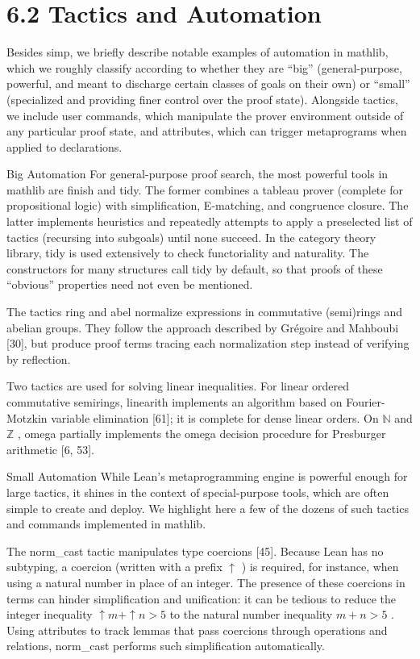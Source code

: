 \documentclass[
]{article}
\newcounter{none} %
\begin{document}
\section{6.2 Tactics and Automation}\label{tactics-and-automation}

Besides simp, we briefly describe notable examples of automation in
mathlib, which we roughly classify according to whether they are ``big''
(general-purpose, powerful, and meant to discharge certain classes of
goals on their own) or ``small'' (specialized and providing finer
control over the proof state). Alongside tactics, we include user
commands, which manipulate the prover environment outside of any
particular proof state, and attributes, which can trigger metaprograms
when applied to declarations.

Big Automation For general-purpose proof search, the most powerful tools
in mathlib are finish and tidy. The former combines a tableau prover
(complete for propositional logic) with simplification, E-matching, and
congruence closure. The latter implements heuristics and repeatedly
attempts to apply a preselected list of tactics (recursing into
subgoals) until none succeed. In the category theory library, tidy is
used extensively to check functoriality and naturality. The constructors
for many structures call tidy by default, so that proofs of these
``obvious'' properties need not even be mentioned.

The tactics ring and abel normalize expressions in commutative
(semi)rings and abelian groups. They follow the approach described by
Grégoire and Mahboubi {[}30{]}, but produce proof terms tracing each
normalization step instead of verifying by reflection.

Two tactics are used for solving linear inequalities. For linear ordered
commutative semirings, linearith implements an algorithm based on
Fourier-Motzkin variable elimination {[}61{]}; it is complete for dense
linear orders. On \(\mathbb{N}\) and \(\mathbb{Z}\) , omega partially
implements the omega decision procedure for Presburger arithmetic {[}6,
53{]}.

Small Automation While Lean's metaprogramming engine is powerful enough
for large tactics, it shines in the context of special-purpose tools,
which are often simple to create and deploy. We highlight here a few of
the dozens of such tactics and commands implemented in mathlib.

The norm\_cast tactic manipulates type coercions {[}45{]}. Because Lean
has no subtyping, a coercion (written with a prefix \(\uparrow\) ) is
required, for instance, when using a natural number in place of an
integer. The presence of these coercions in terms can hinder
simplification and unification: it can be tedious to reduce the integer
inequality \(\uparrow m + \uparrow n > 5\) to the natural number
inequality \(m + n > 5\) . Using attributes to track lemmas that pass
coercions through operations and relations, norm\_cast performs such
simplification automatically.
\end{document}
